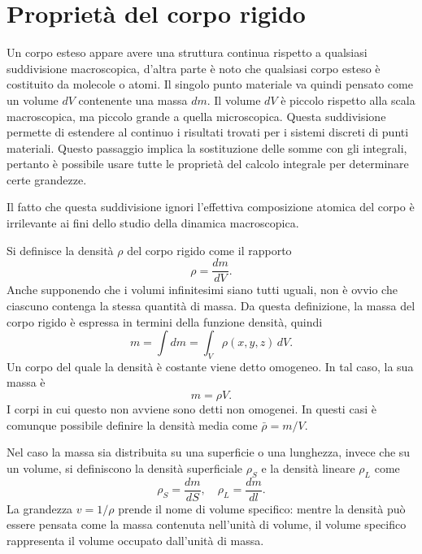 \section{Proprietà del corpo rigido}
Un corpo esteso appare avere una struttura continua rispetto a qualsiasi suddivisione macroscopica, d'altra parte è noto che qualsiasi corpo esteso è costituito da molecole o atomi. Il singolo punto materiale va quindi pensato come un volume $dV$ contenente una massa $dm$. Il volume $dV$ è piccolo rispetto alla scala macroscopica, ma piccolo grande a quella microscopica. Questa suddivisione permette di estendere al continuo i risultati trovati per i sistemi discreti di punti materiali. Questo passaggio implica la sostituzione delle somme con gli integrali, pertanto è possibile usare tutte le proprietà del calcolo integrale per determinare certe grandezze. 
\begin{obs}
    Il fatto che questa suddivisione ignori l'effettiva composizione atomica del corpo è irrilevante ai fini dello studio della dinamica macroscopica. 
\end{obs}
Si definisce la densità $\rho$ del corpo rigido come il rapporto
\begin{equation}
    \rho=\frac{dm}{dV}.
\end{equation}
Anche supponendo che i volumi infinitesimi siano tutti uguali, non è ovvio che ciascuno contenga la stessa quantità di massa. Da questa definizione, la massa del corpo rigido è espressa in termini della funzione densità, quindi
\begin{equation}
    m=\int dm=\int_V\rho(x,y,z)\,dV.
\end{equation}
Un corpo del quale la densità è costante viene detto omogeneo. In tal caso, la sua massa è
\begin{equation}
    m=\rho V.
\end{equation}
I corpi in cui questo non avviene sono detti non omogenei. In questi casi è comunque possibile definire la densità media come $\bar{\rho}=m/V$. 

Nel caso la massa sia distribuita su una superficie o una lunghezza, invece che su un volume, si definiscono la densità superficiale $\rho_S$ e la densità lineare $\rho_L$ come
\begin{equation}
    \rho_S=\frac{dm}{dS},\quad\rho_L=\frac{dm}{dl}.
\end{equation}
La grandezza $v=1/\rho$ prende il nome di volume specifico: mentre la densità può essere pensata come la massa contenuta nell'unità di volume, il volume specifico rappresenta il volume occupato dall'unità di massa. 

